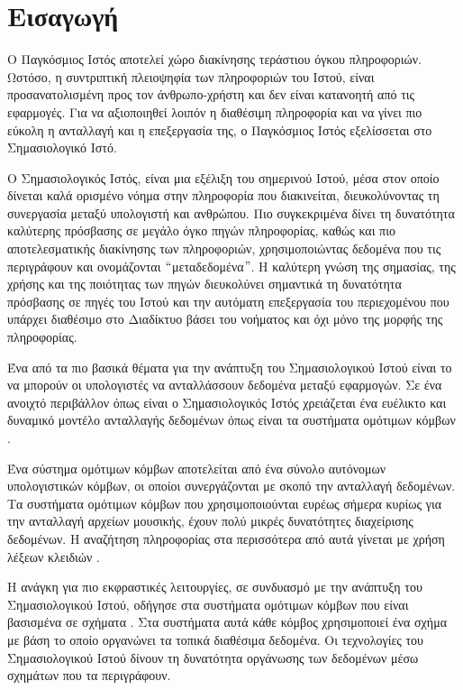 \chapter{Εισαγωγή}
Ο Παγκόσμιος Ιστός αποτελεί χώρο διακίνησης τεράστιου όγκου
πληροφοριών. Ωστόσο, η συντριπτική πλειοψηφία των πληροφοριών του
Ιστού, είναι προσανατολισμένη προς τον άνθρωπο-χρήστη και δεν
είναι κατανοητή από τις εφαρμογές. Για να αξιοποιηθεί λοιπόν η
διαθέσιμη πληροφορία και να γίνει πιο εύκολη η ανταλλαγή και η
επεξεργασία της, ο Παγκόσμιος Ιστός εξελίσσεται στο Σημασιολογικό
Ιστό.

Ο Σημασιολογικός Ιστός, είναι μια εξέλιξη του σημερινού Ιστού,
μέσα στον οποίο δίνεται καλά ορισμένο νόημα στην πληροφορία που
διακινείται, διευκολύνοντας τη συνεργασία μεταξύ υπολογιστή και
ανθρώπου. Πιο συγκεκριμένα δίνει τη
δυνατότητα καλύτερης πρόσβασης σε μεγάλο όγκο πηγών πληροφορίας,
καθώς και πιο αποτελεσματικής διακίνησης των πληροφοριών,
χρησιμοποιώντας δεδομένα που τις περιγράφουν και ονομάζονται
$``$μεταδεδομένα$"$. Η καλύτερη γνώση της σημασίας, της χρήσης και
της ποιότητας των πηγών διευκολύνει σημαντικά τη δυνατότητα
πρόσβασης σε πηγές του Ιστού και την αυτόματη επεξεργασία του
περιεχομένου που υπάρχει διαθέσιμο στο Διαδίκτυο βάσει του
νοήματος και όχι μόνο της μορφής της πληροφορίας.

Ένα από τα πιο βασικά θέματα για την ανάπτυξη του Σημασιολογικού
Ιστού είναι το να μπορούν οι υπολογιστές να ανταλλάσσουν δεδομένα
 μεταξύ εφαρμογών. Σε ένα ανοιχτό περιβάλλον όπως
είναι ο Σημασιολογικός Ιστός χρειάζεται ένα ευέλικτο και δυναμικό
μοντέλο ανταλλαγής δεδομένων όπως είναι τα συστήματα ομότιμων
κόμβων .

Ένα σύστημα ομότιμων κόμβων αποτελείται από ένα σύνολο αυτόνομων
υπολογιστικών κόμβων, οι οποίοι συνεργάζονται με σκοπό την
ανταλλαγή δεδομένων. Τα συστήματα ομότιμων κόμβων που
χρησιμοποιούνται ευρέως σήμερα κυρίως για την ανταλλαγή αρχείων
μουσικής, έχουν πολύ μικρές δυνατότητες διαχείρισης δεδομένων. Η
αναζήτηση πληροφορίας στα περισσότερα από αυτά γίνεται με χρήση
λέξεων κλειδιών .

Η ανάγκη για πιο εκφραστικές λειτουργίες, σε συνδυασμό με την
ανάπτυξη του Σημασιολογικού Ιστού, οδήγησε στα συστήματα ομότιμων
κόμβων που είναι βασισμένα σε σχήματα . Στα συστήματα αυτά κάθε κόμβος
χρησιμοποιεί ένα σχήμα με βάση το οποίο οργανώνει τα τοπικά
διαθέσιμα δεδομένα. Οι τεχνολογίες του Σημασιολογικού Ιστού δίνουν
τη δυνατότητα οργάνωσης των δεδομένων μέσω σχημάτων που τα
περιγράφουν.
 
